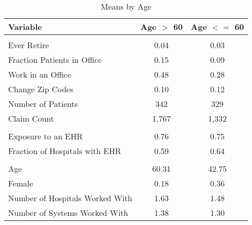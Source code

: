 \begin{table}[ht]

\caption{Means by Age}
\centering
\begin{tabular}[t]{lcc}
\toprule
Variable & Age $>$ 60 & Age $<=$ 60\\
\midrule
\addlinespace[0.3em]
\multicolumn{3}{l}{\textbf{Outcomes}}\\
\hspace{1em}Ever Retire & 0.04 & 0.03\\
\hspace{1em}Fraction Patients in Office & 0.15 & 0.09\\
\hspace{1em}Work in an Office & 0.48 & 0.28\\
\hspace{1em}Change Zip Codes & 0.10 & 0.12\\
\hspace{1em}Number of Patients & 342 & 329\\
\hspace{1em}Claim Count & 1,767 & 1,332\\
\addlinespace[0.3em]
\multicolumn{3}{l}{\textbf{Treatment}}\\
\hspace{1em}Exposure to an EHR & 0.76 & 0.75\\
\hspace{1em}Fraction of Hospitals with EHR & 0.59 & 0.64\\
\addlinespace[0.3em]
\multicolumn{3}{l}{\textbf{Characteristics}}\\
\hspace{1em}Age & 60.31 & 42.75\\
\hspace{1em}Female & 0.18 & 0.36\\
\hspace{1em}Number of Hospitals Worked With & 1.63 & 1.48\\
\hspace{1em}Number of Systems Worked With & 1.38 & 1.30\\
\bottomrule
\end{tabular}
\end{table}
\label{tab:splitstats}